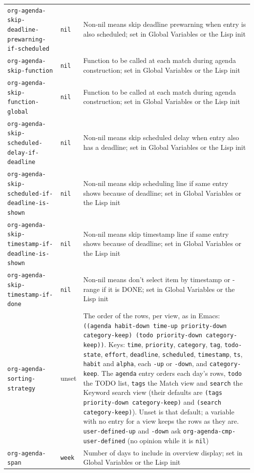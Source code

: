 \documentclass[11pt]{article}
\begin{document}
\begin{center}
\begin{tabular}{lll}
\texttt{org-agenda-skip-deadline-prewarning-if-scheduled} & \texttt{nil} & Non-nil means skip deadline prewarning when entry is also scheduled; set in Global Variables or the Lisp init\\[0pt]
\texttt{org-agenda-skip-function} & \texttt{nil} & Function to be called at each match during agenda construction; set in Global Variables or the Lisp init\\[0pt]
\texttt{org-agenda-skip-function-global} & \texttt{nil} & Function to be called at each match during agenda construction; set in Global Variables or the Lisp init\\[0pt]
\texttt{org-agenda-skip-scheduled-delay-if-deadline} & \texttt{nil} & Non-nil means skip scheduled delay when entry also has a deadline; set in Global Variables or the Lisp init\\[0pt]
\texttt{org-agenda-skip-scheduled-if-deadline-is-shown} & \texttt{nil} & Non-nil means skip scheduling line if same entry shows because of deadline; set in Global Variables or the Lisp init\\[0pt]
\texttt{org-agenda-skip-timestamp-if-deadline-is-shown} & \texttt{nil} & Non-nil means skip timestamp line if same entry shows because of deadline; set in Global Variables or the Lisp init\\[0pt]
\texttt{org-agenda-skip-timestamp-if-done} & \texttt{nil} & Non-nil means don't select item by timestamp or -range if it is DONE; set in Global Variables or the Lisp init\\[0pt]
\texttt{org-agenda-sorting-strategy} & unset & The order of the rows, per view, as in Emacs: \texttt{((agenda habit-down time-up priority-down category-keep) (todo priority-down category-keep))}. Keys: \texttt{time}, \texttt{priority}, \texttt{category}, \texttt{tag}, \texttt{todo-state}, \texttt{effort}, \texttt{deadline}, \texttt{scheduled}, \texttt{timestamp}, \texttt{ts}, \texttt{habit} and \texttt{alpha}, each \texttt{-up} or \texttt{-down}, and \texttt{category-keep}. The \texttt{agenda} entry orders each day's rows, \texttt{todo} the TODO list, \texttt{tags} the Match view and \texttt{search} the Keyword search view (their defaults are \texttt{(tags priority-down category-keep)} and \texttt{(search category-keep)}). Unset is that default; a variable with no entry for a view keeps the rows as they are. \texttt{user-defined-up} and \texttt{-down} ask \texttt{org-agenda-cmp-user-defined} (no opinion while it is \texttt{nil})\\[0pt]
\texttt{org-agenda-span} & \texttt{week} & Number of days to include in overview display; set in Global Variables or the Lisp init\\[0pt]

\end{tabular}
\end{center}
\end{document}
